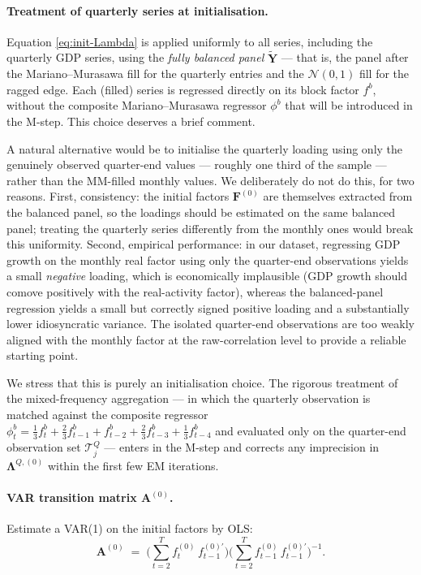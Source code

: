 \documentclass[11pt, a4paper, oneside]{article}
\newcommand{\mY}{\mathbf{Y}}
\newcommand{\mF}{\mathbf{F}}
\begin{document}
\paragraph{Treatment of quarterly series at initialisation.}
Equation \eqref{eq:init-Lambda} is applied uniformly to all series,
including the quarterly GDP series, using the \emph{fully balanced
panel} $\tilde{\mY}$ — that is, the panel after the Mariano--Murasawa
fill for the quarterly entries and the $\mathcal{N}(0,1)$ fill for
the ragged edge. Each (filled) series is regressed directly on its
block factor $f^b$, without the composite Mariano--Murasawa
regressor $\phi^b$ that will be introduced in the M-step. This choice deserves a brief comment.

A natural alternative would be to initialise the quarterly loading
using only the genuinely observed quarter-end values — roughly one
third of the sample — rather than the MM-filled monthly values.
We deliberately do not do this, for two reasons. First, consistency:
the initial factors $\mF^{(0)}$ are themselves extracted from the
balanced panel, so the loadings should be estimated on the same
balanced panel; treating the quarterly series differently from the
monthly ones would break this uniformity. Second, empirical
performance: in our dataset, regressing GDP growth on the monthly
real factor using only the quarter-end observations yields a small
\emph{negative} loading, which is economically implausible (GDP
growth should comove positively with the real-activity factor),
whereas the balanced-panel regression yields a small but correctly
signed positive loading and a substantially lower idiosyncratic
variance. The isolated quarter-end observations are too weakly
aligned with the monthly factor at the raw-correlation level to
provide a reliable starting point.

We stress that this is purely an initialisation choice. The
rigorous treatment of the mixed-frequency aggregation — in which
the quarterly observation is matched against the composite
regressor $\phi^b_t = \tfrac{1}{3} f^b_t + \tfrac{2}{3} f^b_{t-1}
+ f^b_{t-2} + \tfrac{2}{3} f^b_{t-3} + \tfrac{1}{3} f^b_{t-4}$ and
evaluated only on the quarter-end observation set $\mathcal{T}^Q_j$
— enters in the M-step and corrects any
imprecision in $\boldsymbol{\Lambda}^{Q,(0)}$ within the first few
EM iterations.

\paragraph{VAR transition matrix $\mathbf{A}^{(0)}$.}
Estimate a VAR(1) on the initial factors by OLS:
\begin{equation}
\mathbf{A}^{(0)} \;=\; \Big(\sum_{t=2}^{T} f^{(0)}_t\, f^{(0)\prime}_{t-1}\Big)
\Big(\sum_{t=2}^{T} f^{(0)}_{t-1}\, f^{(0)\prime}_{t-1}\Big)^{-1}.
\label{eq:init-A}
\end{equation}
\end{document}
